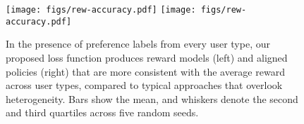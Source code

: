 \begin{figure}[h]
    \centering
    \ifarxiv
    \texttt{[image: figs/rew-accuracy.pdf]}
    \else
    \texttt{[image: figs/rew-accuracy.pdf]}
    \fi
    \vspace{-3mm}
    \caption{In the presence of preference labels from every user type, our proposed loss function produces reward models (left) and aligned policies (right) that are more consistent with the average reward across user types, compared to typical approaches that overlook heterogeneity. Bars show the mean, and whiskers denote the second and third quartiles across five random seeds.}
    \label{fig:semi-synthetic}
\end{figure}

